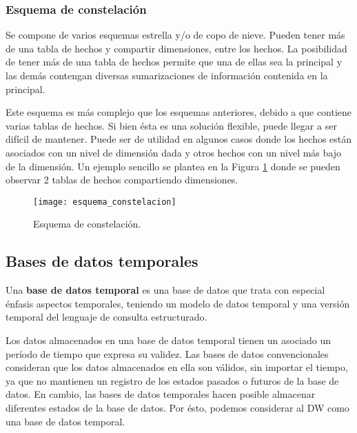 \documentclass[a4paper,11pt]{article}
\begin{document}
    
    \subsubsection{Esquema de constelación}
    
    Se compone de varios esquemas estrella y/o de copo de nieve. Pueden tener más de una tabla de hechos y compartir dimensiones, entre los hechos.
    La posibilidad de tener más de una tabla de hechos permite que una de ellas sea la principal y las demás contengan diversas sumarizaciones de información
    contenida en la principal.
    
    Este esquema es más complejo que los esquemas anteriores, debido a que contiene varias tablas de hechos. Si bien ésta es una solución flexible, puede 
    llegar a ser difícil de mantener. Puede ser de utilidad en algunos casos donde los hechos están asociados con un nivel de dimensión dada y otros hechos 
    con un nivel más bajo de la dimensión. Un ejemplo sencillo se plantea en la Figura \ref{const_sch} donde se pueden observar 2 tablas de hechos 
    compartiendo dimensiones.
    
    \begin{figure}
      \begin{center}
        \texttt{[image: esquema\_constelacion]}
        \caption{Esquema de constelación. \cite{dim_models}}
        \label{const_sch}
      \end{center}
    \end{figure}
    
    
    \subsection{Bases de datos temporales}
    
    Una \textbf{base de datos temporal} es una base de datos que trata con especial énfasis aspectos temporales, teniendo un modelo de datos temporal y una versión
    temporal del lenguaje de consulta estructurado.
    
    Los datos almacenados en una base de datos temporal tienen un asociado un período de tiempo que expresa su validez. Las bases de datos convencionales
    consideran que los datos almacenados en ella son válidos, sin importar el tiempo, ya que no mantienen un registro de los estados pasados o futuros de
    la base de datos. En cambio, las bases de datos temporales hacen posible almacenar diferentes estados de la base de datos. Por ésto, podemos
    considerar al DW como una base de datos temporal.
    
\end{document}
